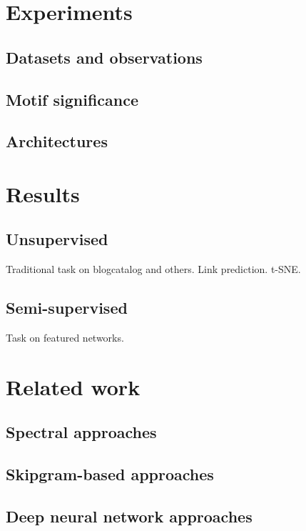 \documentclass{article}
\theoremstyle{definition}
\begin{document}
\section{Experiments}



\subsection{Datasets and observations}

\subsection{Motif significance}

\subsection{Architectures}

\section{Results}

\subsection{Unsupervised}

Traditional task on blogcatalog and others.
Link prediction.
t-SNE.

\subsection{Semi-supervised}

Task on featured networks.

\section{Related work}

\subsection{Spectral approaches}

\subsection{Skipgram-based approaches }

\subsection{Deep neural network approaches}
\end{document}
